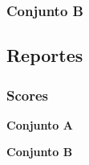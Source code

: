 \subsubsection{Conjunto B}
\label{ds-conjunto-b2}


\subsection{Reportes}
\subsubsection{Scores}
\textbf{Conjunto A}












\textbf{Conjunto B}
\label{ds-conjunto-b}
